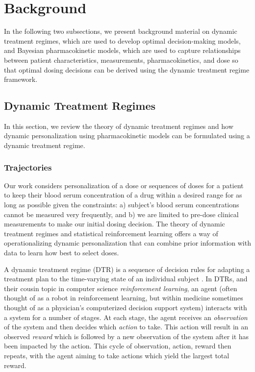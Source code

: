 \section{Background}\label{ss:background}

In the following two subsections, we present background material on dynamic treatment regimes, which are used to develop optimal decision-making models, and Bayesian pharmacokinetic models, which are used to capture relationships between patient characteristics, measurements, pharmacokinetics, and dose so that optimal dosing decisions can be derived using the dynamic treatment regime framework.

\subsection{Dynamic Treatment Regimes}

In this section, we review the theory of dynamic treatment regimes and how dynamic personalization using pharmacokinetic models can be formulated using a dynamic treatment regime.

\subsubsection{Trajectories}

Our work considers personalization of a dose or sequences of doses for a patient to keep their blood serum concentration of a drug within a desired range for as long as possible given the constraints: a) subject’s blood serum concentrations cannot be measured very frequently, and b) we are limited to pre-dose clinical measurements to make our initial dosing decision.  The theory of dynamic treatment regimes and statistical reinforcement learning offers a way of operationalizing dynamic personalization that can combine prior information with data to learn how best to select doses.

A dynamic treatment regime (DTR) is a sequence of decision rules for adapting a treatment plan to the time-varying state of an individual subject \cite{chakraborty2013statistical}. In DTRs, and their cousin topic in computer science \textit{reinforcement learning}, an agent (often thought of as a robot in reinforcement learning, but within medicine sometimes thought of as a physician’s computerized decision support system) interacts with a system for a number of stages. At each stage, the agent receives an \textit{observation} of the system and then decides which \textit{action} to take.  This action will result in an observed \textit{reward} which is followed by a new observation of the system after it has been impacted by the action.  This cycle of observation, action, reward then repeats, with the agent aiming to take actions which yield the largest total reward.


